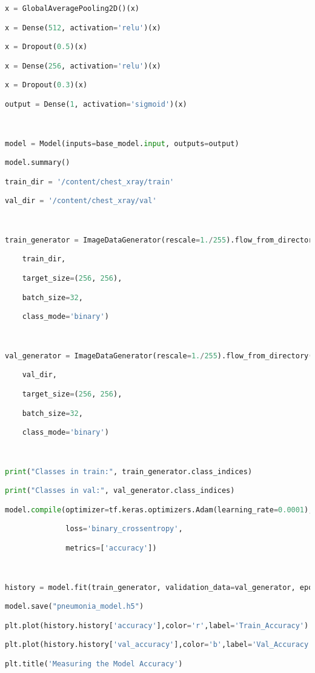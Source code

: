\documentclass{article}
\begin{document}
\begin{lstlisting}[style=mystyle,language=Python]
x = GlobalAveragePooling2D()(x)

x = Dense(512, activation='relu')(x)

x = Dropout(0.5)(x)

x = Dense(256, activation='relu')(x)

x = Dropout(0.3)(x)

output = Dense(1, activation='sigmoid')(x)



model = Model(inputs=base_model.input, outputs=output)

model.summary()

train_dir = '/content/chest_xray/train'

val_dir = '/content/chest_xray/val'



train_generator = ImageDataGenerator(rescale=1./255).flow_from_directory(

    train_dir,

    target_size=(256, 256),

    batch_size=32,

    class_mode='binary')



val_generator = ImageDataGenerator(rescale=1./255).flow_from_directory(

    val_dir,

    target_size=(256, 256),

    batch_size=32,

    class_mode='binary')



print("Classes in train:", train_generator.class_indices)

print("Classes in val:", val_generator.class_indices)

model.compile(optimizer=tf.keras.optimizers.Adam(learning_rate=0.0001),

              loss='binary_crossentropy',

              metrics=['accuracy'])



history = model.fit(train_generator, validation_data=val_generator, epochs=10)

model.save("pneumonia_model.h5")

plt.plot(history.history['accuracy'],color='r',label='Train_Accuracy')

plt.plot(history.history['val_accuracy'],color='b',label='Val_Accuracy')

plt.title('Measuring the Model Accuracy')


\end{lstlisting}
\end{document}
